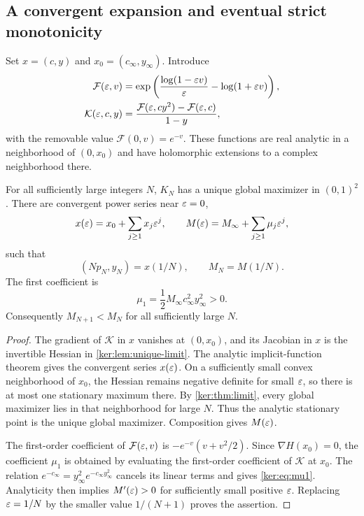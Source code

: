 \subsection{A convergent expansion and eventual strict monotonicity}
Set $x=(c,y)$ and $x_0=(c_\infty,y_\infty)$. Introduce
\begin{align}
 \mathcal F(\varepsilon,v)
  &=\exp\left(\frac{\log(1-\varepsilon v)}{\varepsilon}
                         -\log(1+\varepsilon v)\right),\label{ker:eq:Fanalytic}\\
 \mathcal K(\varepsilon,c,y)
  &=\frac{\mathcal F(\varepsilon,cy^2)-\mathcal F(\varepsilon,c)}{1-y},
       \label{ker:eq:Kanalytic}
\end{align}
with the removable value $\mathcal F(0,v)=e^{-v}$. These functions
are real analytic in a neighborhood of $(0,x_0)$ and have holomorphic
extensions to a complex neighborhood there.

\begin{theorem}\label{ker:thm:analytic}
For all sufficiently large integers $N$, $K_N$ has a unique global
maximizer in $(0,1)^2$. There are convergent power series near
$\varepsilon=0$,
\begin{equation}\label{ker:eq:series}
 x(\varepsilon)=x_0+\sum_{j\ge1}x_j\varepsilon^j,\qquad
 M(\varepsilon)=M_\infty+\sum_{j\ge1}\mu_j\varepsilon^j,
\end{equation}
such that
\[
 (Np_N,y_N)=x(1/N),\qquad M_N=M(1/N).
\]
The first coefficient is
\begin{equation}\label{ker:eq:mu1}
 \mu_1=\frac12M_\infty c_\infty^2y_\infty^2>0.
\end{equation}
Consequently $M_{N+1}<M_N$ for all sufficiently large $N$.
\end{theorem}
\begin{proof}
The gradient of $\mathcal K$ in $x$ vanishes at $(0,x_0)$, and its
Jacobian in $x$ is the invertible Hessian in
\cref{ker:lem:unique-limit}. The analytic implicit-function theorem
gives the convergent series $x(\varepsilon)$. On a sufficiently small convex
neighborhood of $x_0$, the Hessian remains negative definite for
small $\varepsilon$, so there is at most one stationary maximum there.
By \cref{ker:thm:limit}, every global maximizer lies in that
neighborhood for large $N$. Thus the analytic stationary point is the
unique global maximizer. Composition gives $M(\varepsilon)$.

The first-order coefficient of $\mathcal F(\varepsilon,v)$ is
$-e^{-v}(v+v^2/2)$. Since $\nabla H(x_0)=0$, the coefficient
$\mu_1$ is obtained by evaluating the first-order coefficient of
$\mathcal K$ at $x_0$. The relation
$e^{-c_\infty}=y_\infty^2e^{-c_\infty y_\infty^2}$ cancels its
linear terms and gives \eqref{ker:eq:mu1}. Analyticity then implies
$M'(\varepsilon)>0$ for sufficiently small positive $\varepsilon$. Replacing
$\varepsilon=1/N$ by the smaller value $1/(N+1)$ proves the assertion.
\end{proof}

